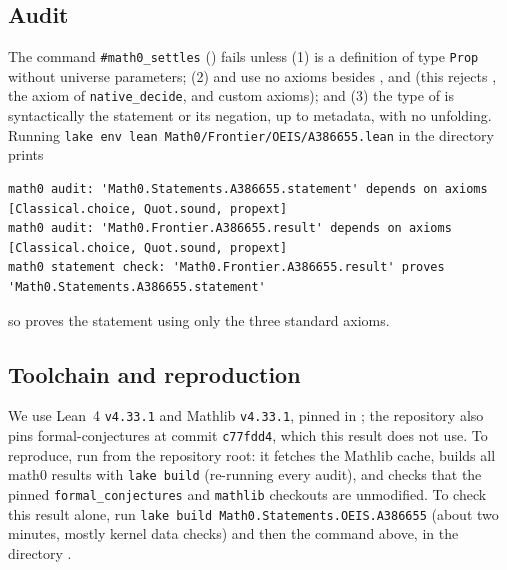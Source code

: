 \documentclass[11pt]{amsart}
\theoremstyle{plain}
\theoremstyle{definition}
\begin{document}
\subsection*{Audit}
The command \texttt{\#math0\_settles} () fails unless (1)  is a definition of type \texttt{Prop} without universe parameters; (2)  and  use no axioms besides ,  and  (this rejects , the axiom  of \texttt{native\_decide}, and custom axioms); and (3) the type of  is syntactically the statement or its negation, up to metadata, with no unfolding.
Running \texttt{lake env lean Math0/Frontier/OEIS/A386655.lean} in the directory  prints\par\nobreak\noindent
\begin{minipage}{\linewidth}
\begin{lstlisting}[basicstyle=\ttfamily\scriptsize]
math0 audit: 'Math0.Statements.A386655.statement' depends on axioms [Classical.choice, Quot.sound, propext]
math0 audit: 'Math0.Frontier.A386655.result' depends on axioms [Classical.choice, Quot.sound, propext]
math0 statement check: 'Math0.Frontier.A386655.result' proves 'Math0.Statements.A386655.statement'
\end{lstlisting}
\end{minipage}
so  proves the statement using only the three standard axioms.

\subsection*{Toolchain and reproduction}
We use Lean~4 \cite{Lean4} \texttt{v4.33.1} and Mathlib \cite{Mathlib} \texttt{v4.33.1}, pinned in ; the repository also pins formal-conjectures \cite{FC} at commit \texttt{c77fdd4}, which this result does not use.
To reproduce, run  from the repository root: it fetches the Mathlib cache, builds all math0 results with \texttt{lake build} (re-running every audit), and checks that the pinned \texttt{formal\_conjectures} and \texttt{mathlib} checkouts are unmodified.
To check this result alone, run \texttt{lake build Math0.Statements.OEIS.A386655} (about two minutes, mostly kernel data checks) and then the command above, in the directory .
\end{document}
